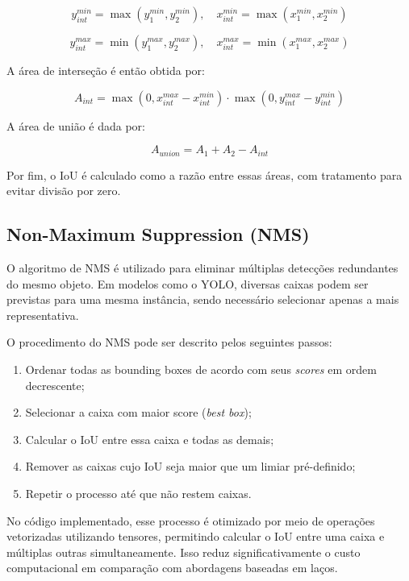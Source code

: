 \documentclass[conference]{IEEEtran}
\begin{document}
\begin{equation}
y_{int}^{min} = \max(y_1^{min}, y_2^{min}), \quad x_{int}^{min} = \max(x_1^{min}, x_2^{min})
\end{equation}

\begin{equation}
y_{int}^{max} = \min(y_1^{max}, y_2^{max}), \quad x_{int}^{max} = \min(x_1^{max}, x_2^{max})
\end{equation}

A área de interseção é então obtida por:

\begin{equation}
A_{int} = \max(0, x_{int}^{max} - x_{int}^{min}) \cdot \max(0, y_{int}^{max} - y_{int}^{min})
\end{equation}

A área de união é dada por:

\begin{equation}
A_{union} = A_1 + A_2 - A_{int}
\end{equation}

Por fim, o IoU é calculado como a razão entre essas áreas, com tratamento para evitar divisão por zero.

\subsection{Non-Maximum Suppression (NMS)}

O algoritmo de NMS é utilizado para eliminar múltiplas detecções redundantes do mesmo objeto. Em modelos como o YOLO, diversas caixas podem ser previstas para uma mesma instância, sendo necessário selecionar apenas a mais representativa.

O procedimento do NMS pode ser descrito pelos seguintes passos:

\begin{enumerate}
    \item Ordenar todas as bounding boxes de acordo com seus \textit{scores} em ordem decrescente;
    \item Selecionar a caixa com maior score (\textit{best box});
    \item Calcular o IoU entre essa caixa e todas as demais;
    \item Remover as caixas cujo IoU seja maior que um limiar pré-definido;
    \item Repetir o processo até que não restem caixas.
\end{enumerate}

No código implementado, esse processo é otimizado por meio de operações vetorizadas utilizando tensores, permitindo calcular o IoU entre uma caixa e múltiplas outras simultaneamente. Isso reduz significativamente o custo computacional em comparação com abordagens baseadas em laços.
\end{document}
